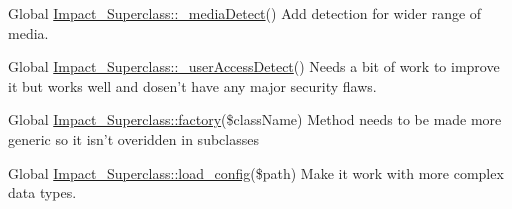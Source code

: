 \begin{DoxyDescription}
\item[Global \hyperlink{classImpact__Superclass_a36245233fa9d0fbb0a71e2a985e79c72}{Impact\_\-Superclass::\_\-mediaDetect}() ]Add detection for wider range of media. 
\end{DoxyDescription}

\label{todo__todo000005}
\hypertarget{todo__todo000005}{}
 
\begin{DoxyDescription}
\item[Global \hyperlink{classImpact__Superclass_a6e7a5edea355b304f86d731e4d57dc84}{Impact\_\-Superclass::\_\-userAccessDetect}() ]Needs a bit of work to improve it but works well and dosen't have any major security flaws. 
\end{DoxyDescription}

\label{todo__todo000009}
\hypertarget{todo__todo000009}{}
 
\begin{DoxyDescription}
\item[Global \hyperlink{classImpact__Superclass_a8c0508f1ea0fe72c8d0e6e8dd2a1c41c}{Impact\_\-Superclass::factory}(\$className) ]Method needs to be made more generic so it isn't overidden in subclasses 
\end{DoxyDescription}

\label{todo__todo000008}
\hypertarget{todo__todo000008}{}
 
\begin{DoxyDescription}
\item[Global \hyperlink{classImpact__Superclass_aa0142dba3a229260d22d37308f9544f7}{Impact\_\-Superclass::load\_\-config}(\$path) ]Make it work with more complex data types. 
\end{DoxyDescription}